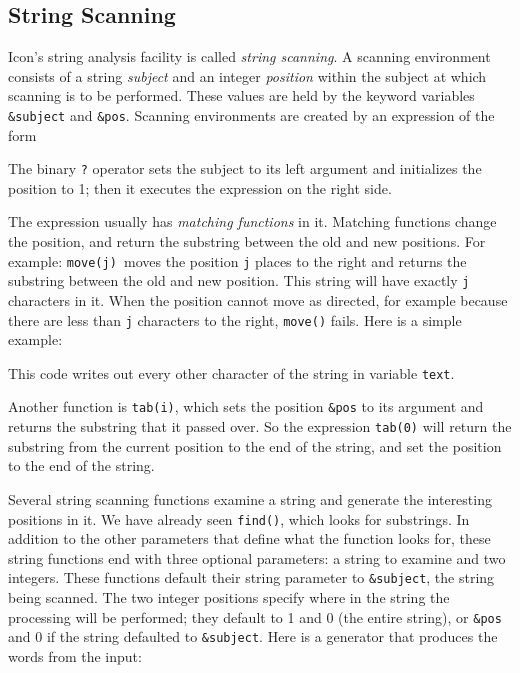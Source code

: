 \subsection{String Scanning}

Icon's string analysis facility is called
\textit{string scanning}. A
scanning environment consists of a string
\textit{subject} and an
integer \textit{position} within the subject at
which scanning is to be performed. These values are held by the keyword
variables \texttt{\&subject} and \texttt{\&pos}. Scanning environments
are created by an expression of the form


The binary \texttt{?} operator sets the subject to its left argument and
initializes the position to 1; then it executes the expression on the
right side.

The expression usually has \textit{matching
functions} in it. Matching functions change the position, and return
the substring between the old and new positions. For example:
\texttt{move(j)}\texttt{ }moves the position \texttt{j} places to the
right and returns the substring between the old and new position. This
string will have exactly \texttt{j} characters in it. When the position
cannot move as directed, for example because there are less than
\texttt{j} characters to the right, \texttt{move()}
fails. Here is a simple example:


This code writes out every other character of the string in variable
\texttt{text}.

Another function is \texttt{tab(i)}, which sets the
position \texttt{\&pos} to its argument and returns the substring that
it passed over. So the expression \texttt{tab(0)} will return the
substring from the current position to the end of the string, and set
the position to the end of the string.

Several string scanning functions examine a string and generate the interesting
positions in it. We have already seen \texttt{find()},
which looks for substrings. In addition to the other parameters that
define what the function looks for, these string functions end with
three optional parameters: a string to examine and two integers. These
functions default their string
parameter to \texttt{\&subject}, the string being scanned. The two
integer positions specify where in the string the processing will be
performed; they default to 1 and 0 (the entire string), or
\texttt{\&pos} and 0 if the string defaulted to \texttt{\&subject}.
Here is a generator that produces the words from the
input:

